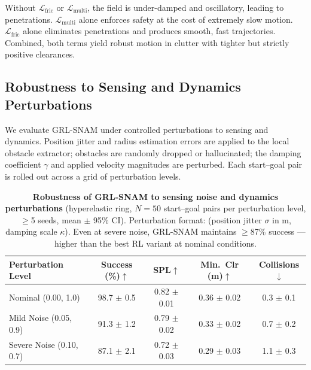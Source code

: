 Without $\mathcal{L}_{\mathrm{fric}}$ or $\mathcal{L}_{\mathrm{multi}}$,
the field is under-damped and oscillatory, leading to penetrations.
$\mathcal{L}_{\mathrm{multi}}$ alone enforces safety at the cost of
extremely slow motion.
$\mathcal{L}_{\mathrm{fric}}$ alone eliminates penetrations and produces
smooth, fast trajectories.
Combined, both terms yield robust motion in clutter with tighter but
strictly positive clearances.

\subsection{Robustness to Sensing and Dynamics Perturbations}
\label{subsec:ch6:robustness}

We evaluate GRL-SNAM under controlled perturbations to sensing and dynamics.
Position jitter and radius estimation errors are applied to the local
obstacle extractor; obstacles are randomly dropped or hallucinated;
the damping coefficient $\gamma$ and applied velocity magnitudes are perturbed.
Each start--goal pair is rolled out across a grid of perturbation levels.

\begin{table}[htbp]
\centering
\caption{%
  \textbf{Robustness of GRL-SNAM to sensing noise and dynamics perturbations}
  (hyperelastic ring, $N = 50$ start--goal pairs per perturbation level,
  $\geq$5 seeds, mean $\pm$ 95\% CI).
  Perturbation format: (position jitter $\sigma$ in m, damping scale $\kappa$).
  Even at severe noise, GRL-SNAM maintains $\geq$87\% success —
  higher than the best RL variant at nominal conditions.
}
\label{tab:ch6:robustness}
\vspace{0.4em}
\small
\setlength{\tabcolsep}{5pt}
\renewcommand{\arraystretch}{1.2}
\begin{tabular}{lcccc}
\toprule
\textbf{Perturbation Level} &
\textbf{Success (\%)}$\uparrow$ &
\textbf{SPL}$\uparrow$ &
\textbf{Min.\ Clr (m)}$\uparrow$ &
\textbf{Collisions}$\downarrow$ \\
\midrule
Nominal (0.00, 1.0)       & 98.7 $\pm$ 0.5 & 0.82 $\pm$ 0.01 & 0.36 $\pm$ 0.02 & 0.3 $\pm$ 0.1 \\
Mild Noise (0.05, 0.9)    & 91.3 $\pm$ 1.2 & 0.79 $\pm$ 0.02 & 0.33 $\pm$ 0.02 & 0.7 $\pm$ 0.2 \\
Severe Noise (0.10, 0.7)  & 87.1 $\pm$ 2.1 & 0.72 $\pm$ 0.03 & 0.29 $\pm$ 0.03 & 1.1 $\pm$ 0.3 \\
\bottomrule
\end{tabular}
\end{table}

